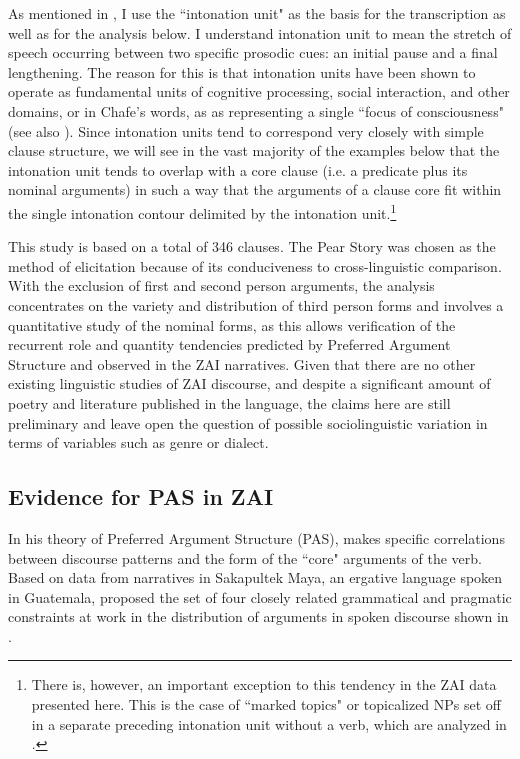As mentioned in , I use the ``intonation unit" \citep{chafe1994} as the basis for the transcription as well as for the analysis below. I understand intonation unit to mean the stretch of speech occurring between two specific prosodic cues: an initial pause and a final lengthening. The reason for this is that intonation units have been shown to operate as fundamental units of cognitive processing, social interaction, and other domains, or in Chafe's words, as as representing a single ``focus of consciousness" (see also \citealt{dubois1993}). Since intonation units tend to correspond very closely with simple clause structure, we will see in the vast majority of the examples below that the intonation unit tends to overlap with a core clause (i.e. a predicate plus its nominal arguments) in such a way that the arguments of a clause core fit within the single intonation contour delimited by the intonation unit.\footnote{There is, however, an important exception to this tendency in the ZAI data presented here. This is the case of ``marked topics" or topicalized NPs set off in a separate preceding intonation unit without a verb, which are analyzed in .}

This study is based on a total of 346 clauses. The Pear Story was chosen as the method of elicitation because of its conduciveness to cross-linguistic comparison. With the exclusion of first and second person arguments, the analysis concentrates on the variety and distribution of third person forms and involves a quantitative study of the nominal forms, as this allows verification of the recurrent role and quantity tendencies predicted by Preferred Argument Structure and observed in the ZAI narratives. Given that there are no other existing linguistic studies of ZAI discourse, and despite a significant amount of poetry and literature published in the language, the claims here are still preliminary and leave open the question of possible sociolinguistic variation in terms of variables such as genre or dialect.


\subsection{Evidence for PAS in ZAI}\label{evidenceforpas}

In his theory of Preferred Argument Structure (PAS), \citet{dubois1987,dubois2003a,dubois2003b} makes specific correlations between discourse patterns and the form of the ``core" arguments of the verb. Based on data from narratives in Sakapultek Maya, an ergative language spoken in Guatemala, \citet{dubois1987} proposed the set of four closely related grammatical and pragmatic constraints at work in the distribution of arguments in spoken discourse shown in .

